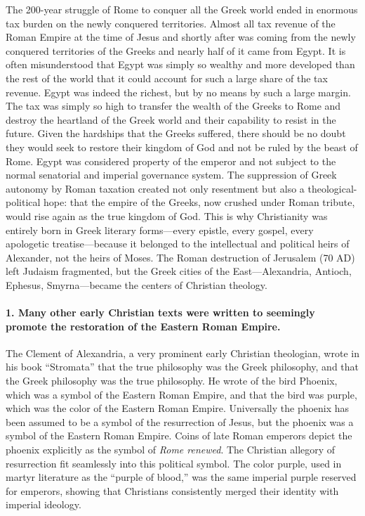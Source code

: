 The 200-year struggle of Rome to conquer all the Greek world ended in enormous tax burden on the newly conquered territories.
Almost all tax revenue of the Roman Empire at the time of Jesus and shortly after was coming from the newly conquered territories of the Greeks and nearly half of it came from Egypt.
It is often misunderstood that Egypt was simply so wealthy and more developed than the rest of the world that it could account for such a large share of the tax revenue.
Egypt was indeed the richest, but by no means by such a large margin.
The tax was simply so high to transfer the wealth of the Greeks to Rome and destroy the heartland of the Greek world and their capability to resist in the future.
Given the hardships that the Greeks suffered, there should be no doubt they would seek to restore their kingdom of God and not be ruled by the beast of Rome.
Egypt was considered property of the emperor and not subject to the normal senatorial and imperial governance system.
The suppression of Greek autonomy by Roman taxation created not only resentment but also a theological-political hope: that the empire of the Greeks, now crushed under Roman tribute, would rise again as the true kingdom of God.
This is why Christianity was entirely born in Greek literary forms---every epistle, every gospel, every apologetic treatise---because it belonged to the intellectual and political heirs of Alexander, not the heirs of Moses.
The Roman destruction of Jerusalem (70 AD) left Judaism fragmented, but the Greek cities of the East---Alexandria, Antioch, Ephesus, Smyrna---became the centers of Christian theology.

\paragraph{1.
Many other early Christian texts were written to seemingly promote the restoration of the Eastern Roman Empire.}\label{par:many-other-early-christian-texts-were-written-to-seemingly-promote-the-restoration-of-the-eastern-roman-empire.}

The Clement of Alexandria, a very prominent early Christian theologian, wrote in his book ``Stromata'' that the true philosophy was the Greek philosophy, and that the Greek philosophy was the true philosophy.
He wrote of the bird Phoenix, which was a symbol of the Eastern Roman Empire, and that the bird was purple, which was the color of the Eastern Roman Empire.
Universally the phoenix has been assumed to be a symbol of the resurrection of Jesus, but the phoenix was a symbol of the Eastern Roman Empire.
Coins of late Roman emperors depict the phoenix explicitly as the symbol of \emph{Rome renewed}.
The Christian allegory of resurrection fit seamlessly into this political symbol.
The color purple, used in martyr literature as the ``purple of blood,'' was the same imperial purple reserved for emperors, showing that Christians consistently merged their identity with imperial ideology.

